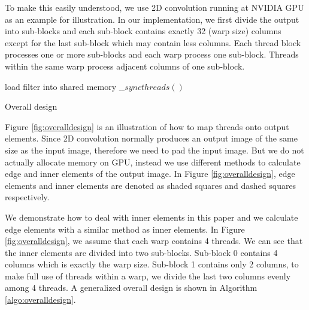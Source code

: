 To make this easily understood, we use 2D convolution {\color{red}running at NVIDIA GPU} as an example for illustration. In our implementation, we first divide the output
into sub-blocks and each sub-block contains exactly 32 ({\color{red}warp size}) columns except for the last sub-block which may contain less columns.
Each {\color{red}thread block} processes one or more sub-blocks and each warp process one sub-block. Threads within the same warp process adjacent
columns of one sub-block.
\begin{algorithm}
	load filter into shared memory\;
	$\_\_syncthreads()$\;
	\caption{Overall design}
	\label{algo:overalldesign}
\end{algorithm}

Figure \ref{fig:overalldesign} is an illustration of how to map threads onto output elements. Since 2D convolution normally produces
an output image of the same size as the input image, therefore we need to pad the input image. But we do not actually allocate memory on
GPU, instead we use different methods to calculate edge and inner elements of the output image. In Figure \ref{fig:overalldesign}, edge
elements and inner elements are denoted as shaded squares and dashed squares respectively.

We demonstrate how to deal with inner elements in this paper and we calculate edge elements with a similar method as inner elements. In
Figure \ref{fig:overalldesign}, we assume that each {\color{red}warp} contains 4 threads. We can see that the inner elements are divided into two
sub-blocks. Sub-block 0 contains 4 columns which is exactly the {\color{red}warp size}. Sub-block 1 contains only 2 columns, to make full use of threads
within a {\color{red}warp}, we divide the last two columns evenly among 4 threads. A generalized overall design is shown in Algorithm
\ref{algo:overalldesign}.

